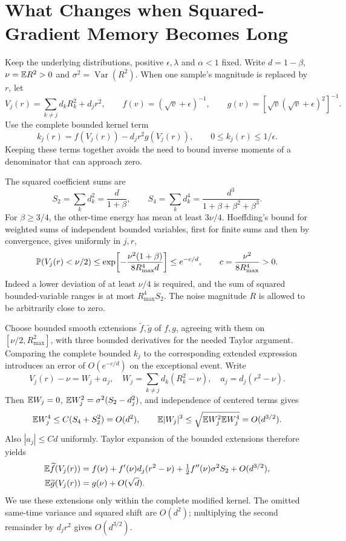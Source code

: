 \section{What Changes when Squared-Gradient Memory Becomes Long}\label{app:slow}

Keep the underlying distributions, positive $\epsilon,\lambda$ and $\alpha<1$ fixed.
Write $d=1-\beta$, $\nu=\mathbb E R^2>0$ and
$\sigma^2=\operatorname{Var}(R^2)$. When one sample's magnitude is replaced by $r$, let
\[
 V_j(r)=\sum_{k\ne j}d_kR_k^2+d_jr^2,\qquad
 f(v)=(\sqrt v+\epsilon)^{-1},\qquad
 g(v)=[\sqrt v(\sqrt v+\epsilon)^2]^{-1}.
\]
Use the complete bounded kernel term
\[
 k_j(r)=f(V_j(r))-d_jr^2g(V_j(r)),\qquad 0\leq k_j(r)\leq1/\epsilon.
\]
Keeping these terms together avoids the need to bound inverse moments
of a denominator that can approach zero.

The squared coefficient sums are
\[
 S_2=\sum_kd_k^2=\frac d{1+\beta},\qquad
 S_4=\sum_kd_k^4=\frac{d^3}{1+\beta+\beta^2+\beta^3}.
\]
For $\beta\geq3/4$, the other-time energy has mean at least $3\nu/4$.
Hoeffding's bound for weighted sums of independent bounded variables,
first for finite sums and then by convergence, gives
uniformly in $j,r$,
\[
 \mathbb P(V_j(r)<\nu/2)
 \leq\exp\!\left[-\frac{\nu^2(1+\beta)}{8R_{\max}^4d}\right]
 \leq e^{-c/d},\qquad c=\frac{\nu^2}{8R_{\max}^4}>0.
\]
Indeed a lower deviation of at least $\nu/4$ is required, and the sum
of squared bounded-variable ranges is at most $R_{\max}^4S_2$.
The noise magnitude $R$ is allowed to be arbitrarily close to zero.

Choose bounded smooth extensions $\widetilde f,\widetilde g$ of $f,g$, agreeing with them on
$[\nu/2,R_{\max}^2]$, with three bounded derivatives for the needed
Taylor argument. Comparing the complete bounded $k_j$ to the corresponding
extended expression introduces an error of $O(e^{-c/d})$ on the exceptional event.
Write
\[
 V_j(r)-\nu=W_j+a_j,\quad
 W_j=\sum_{k\ne j}d_k(R_k^2-\nu),\quad a_j=d_j(r^2-\nu).
\]
Then $\mathbb E W_j=0$, $\mathbb E W_j^2=\sigma^2(S_2-d_j^2)$, and independence
of centered terms gives
\[
 \mathbb E W_j^4\leq C(S_4+S_2^2)=O(d^2),\qquad
 \mathbb E|W_j|^3\leq\sqrt{\mathbb E W_j^2\mathbb E W_j^4}=O(d^{3/2}).
\]
Also $|a_j|\leq Cd$ uniformly. Taylor expansion of the bounded extensions
therefore yields
\begin{align*}
 \mathbb E\widetilde f(V_j(r))&=f(\nu)+f'(\nu)d_j(r^2-\nu)
                 +\tfrac12f''(\nu)\sigma^2S_2+O(d^{3/2}),\\
 \mathbb E\widetilde g(V_j(r))&=g(\nu)+O(\sqrt d).
\end{align*}
We use these extensions only within the complete modified kernel.
The omitted same-time variance and squared shift are $O(d^2)$; multiplying
the second remainder by $d_jr^2$ gives $O(d^{3/2})$.

